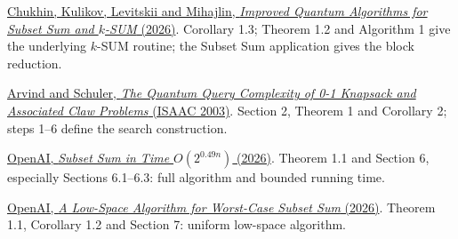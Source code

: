 \documentclass[11pt,a4paper]{article}
\theoremstyle{problemstyle}
\newenvironment{algorithmindex}[1]{%
  \begin{enumerate}[label={[#1.\arabic*]},leftmargin=3.4em,labelsep=0.6em,itemsep=4pt,topsep=3pt,parsep=0pt]
  \small
}{\end{enumerate}}
\begin{document}
\begin{algorithmindex}{18}
\item \href{https://arxiv.org/pdf/2608.07309}{Chukhin, Kulikov, Levitskii and Mihajlin, \emph{Improved Quantum Algorithms for Subset Sum and $k$-SUM} (2026)}. Corollary 1.3; Theorem 1.2 and Algorithm 1 give the underlying $k$-SUM routine; the Subset Sum application gives the block reduction.
\item \href{https://arxiv.org/pdf/quant-ph/0212048}{Arvind and Schuler, \emph{The Quantum Query Complexity of 0-1 Knapsack and Associated Claw Problems} (ISAAC 2003)}. Section 2, Theorem 1 and Corollary 2; steps 1--6 define the search construction.
\item \href{https://github.com/openai/math/tree/main/preprints/Subset-Sum-in-Time-2-power-0-49n-October-4-2026}{OpenAI, \emph{Subset Sum in Time $O(2^{0.49n})$} (2026)}. Theorem 1.1 and Section 6, especially Sections 6.1--6.3: full algorithm and bounded running time.
\item \href{https://github.com/openai/math/tree/main/preprints/A-Low-Space-Algorithm-for-Worst-Case-Subset-Sum-September-26-2026}{OpenAI, \emph{A Low-Space Algorithm for Worst-Case Subset Sum} (2026)}. Theorem 1.1, Corollary 1.2 and Section 7: uniform low-space algorithm.
\end{algorithmindex}
\end{document}
